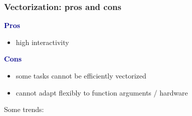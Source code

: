 \documentclass[
    xcolor={svgnames,dvipsnames},
    hyperref={colorlinks, citecolor=DeepPink4, linkcolor=DarkRed, urlcolor=DarkBlue}
    ]{beamer}  %
\newcommand{\navy}[1]{\textcolor{DarkBlue}{\bf #1}}
\newcommand{\1}{\mathbbm 1}
\begin{document}
\begin{frame}
    \frametitle{Vectorization: pros and cons}

    \navy{Pros}

    \begin{itemize}
        \item high interactivity 
    \end{itemize}

    \vspace{0.5em}
    \vspace{0.5em}

    \navy{Cons}

    \begin{itemize}
        \item some tasks cannot be efficiently vectorized
        \vspace{0.2em}
        \item cannot adapt flexibly to function arguments /
            hardware
    \end{itemize}


\end{frame}



\begin{frame}

    Some trends: 

    \begin{figure}
       \begin{center}
       \end{center}
    \end{figure}

\end{frame}
\end{document}
